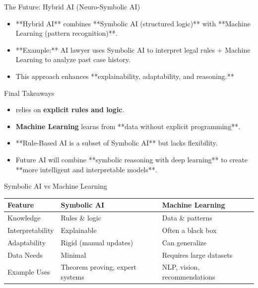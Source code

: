 \documentclass{beamer}
\begin{document}
\begin{frame}{The Future: Hybrid AI (Neuro-Symbolic AI)}
    \begin{itemize}
        \item **Hybrid AI** combines **Symbolic AI (structured logic)** with **Machine Learning (pattern recognition)**.
        \item **Example:** AI lawyer uses Symbolic AI to interpret legal rules + Machine Learning to analyze past case history.
        \item This approach enhances **explainability, adaptability, and reasoning.**
    \end{itemize}
\end{frame}

\begin{frame}{Final Takeaways}
    \begin{itemize}
        \item {} relies on \textbf{explicit rules and logic}.
        \item \textbf{Machine Learning} learns from **data without explicit programming**.
        \item **Rule-Based AI is a subset of Symbolic AI** but lacks flexibility.
        \item Future AI will combine **symbolic reasoning with deep learning** to create **more intelligent and interpretable models**.
    \end{itemize}
\end{frame}

\begin{frame}{Symbolic AI vs Machine Learning}
    \begin{tcolorbox}[colback=white!95!black]
        \begin{tabularx}{\textwidth}{>{\raggedright\arraybackslash\hsize=0.8\hsize}X>{\raggedright\arraybackslash\hsize=1.1\hsize}X>{\raggedright\arraybackslash\hsize=1.1\hsize}X}
            \textbf{Feature} & \textbf{Symbolic AI} & \textbf{Machine Learning} \\
            \midrule
            Knowledge & Rules \& logic & Data \& patterns \\
            \hline
            Interpretability & Explainable & Often a black box \\
            \hline
            Adaptability & Rigid (manual updates) & Can generalize \\
            \hline
            Data Needs & Minimal & Requires large datasets \\
            \hline
            Example Uses & Theorem proving, expert systems & NLP, vision, recommendations \\
        \end{tabularx}
    \end{tcolorbox}
\end{frame}
\end{document}
